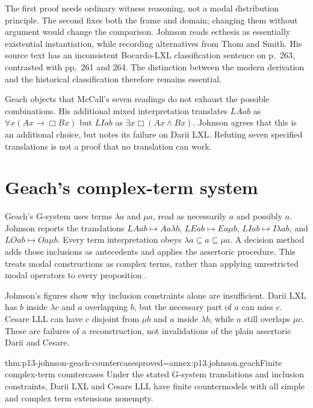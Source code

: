 The first proof needs ordinary witness reasoning, not a modal
distribution principle. The second fixes both the frame and domain;
changing them without argument would change the comparison.
Johnson reads ecthesis as essentially existential instantiation, while
recording alternatives from Thom and Smith. His source text has an
inconsistent Bocardo-LXL classification sentence on p.~263, contrasted
with pp.~261 and 264. The distinction between the modern derivation and
the historical classification therefore remains essential.

Geach objects that McCall's seven readings do not exhaust the possible
combinations. His additional mixed interpretation translates
\(LAab\) as \(\forall x(Ax\to\Box Bx)\) but \(LIab\) as
\(\exists x\Box(Ax\land Bx)\). Johnson agrees that this is an additional
choice, but notes its failure on Darii LXL. Refuting seven specified
translations is not a proof that no translation can work.

\section{Geach's complex-term system}
\label{sec:p13-johnson-geach}

Geach's G-system uses terms \(\lambda a\) and \(\mu a\), read as
necessarily \(a\) and possibly \(a\). Johnson reports the translations
\(LAab\mapsto Aa\lambda b\), \(LEab\mapsto Ea\mu b\),
\(LIab\mapsto I\lambda a b\), and \(LOab\mapsto Oa\mu b\).
Every term interpretation obeys
\(\lambda a\subseteq a\subseteq\mu a\).
A decision method adds those inclusions as antecedents and applies the
assertoric procedure. This treats modal constructions as complex terms,
rather than applying unrestricted modal operators to every proposition
\parencite[pp.~262--264]{Johnson2004ModalSyllogisms}.

Johnson's figures show why inclusion constraints alone are insufficient.
Darii LXL has \(b\) inside \(\lambda c\) and \(a\) overlapping \(b\),
but the necessary part of \(a\) can miss \(c\).
Cesare LLL can have \(c\) disjoint from \(\mu b\) and \(a\) inside
\(\lambda b\), while \(a\) still overlaps \(\mu c\).
These are failures of a reconstruction, not invalidations of the plain
assertoric Darii and Cesare.

\begin{hbtheorem}{thm:p13-johnson-geach-countercases}{proved=annex:p13.johnson.geach}{Finite complex-term countercases}
Under the stated G-system translations and inclusion constraints,
Darii LXL and Cesare LLL have finite countermodels with all simple and
complex term extensions nonempty.
\end{hbtheorem}

